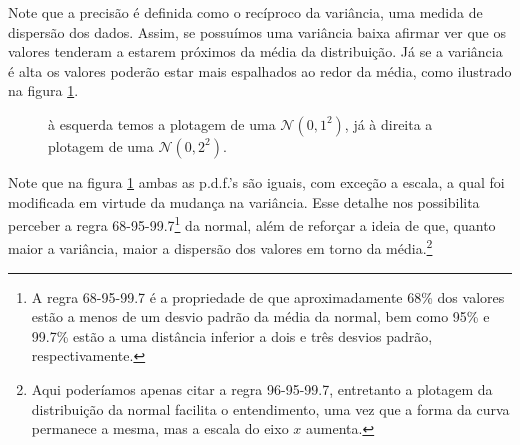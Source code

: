 \documentclass{article}
\begin{document}
Note que a precisão é definida como o recíproco da variância, uma medida de dispersão dos dados. Assim, se possuímos uma variância baixa afirmar ver que os valores tenderam a estarem próximos da média da distribuição. Já se a variância é alta os valores poderão estar mais espalhados ao redor da média, como ilustrado na figura \ref{gaussianas}.
\begin{figure}[H]
    \caption{à esquerda temos a plotagem de uma $\mathcal{N}(0, 1^2)$, já à direita a plotagem de uma $\mathcal{N}(0, 2^2)$.}
    \label{gaussianas}
\end{figure}

Note que na figura \ref{gaussianas} ambas as p.d.f.'s são iguais, com exceção a escala, a qual foi modificada em virtude da mudança na variância. Esse detalhe nos possibilita perceber a regra 68-95-99.7\footnote{A regra 68-95-99.7 é a propriedade de que aproximadamente 68\% dos valores estão a menos de um desvio padrão da média da normal, bem como 95\% e 99.7\% estão a uma distância inferior a dois e três desvios padrão, respectivamente.} da normal, além de reforçar a ideia de que, quanto maior a variância, maior a dispersão dos valores em torno da média.\footnote{Aqui poderíamos apenas citar a regra 96-95-99.7, entretanto a plotagem da distribuição da normal facilita o entendimento, uma vez que a forma da curva permanece a mesma, mas a escala do eixo $x$ aumenta.}
\end{document}
